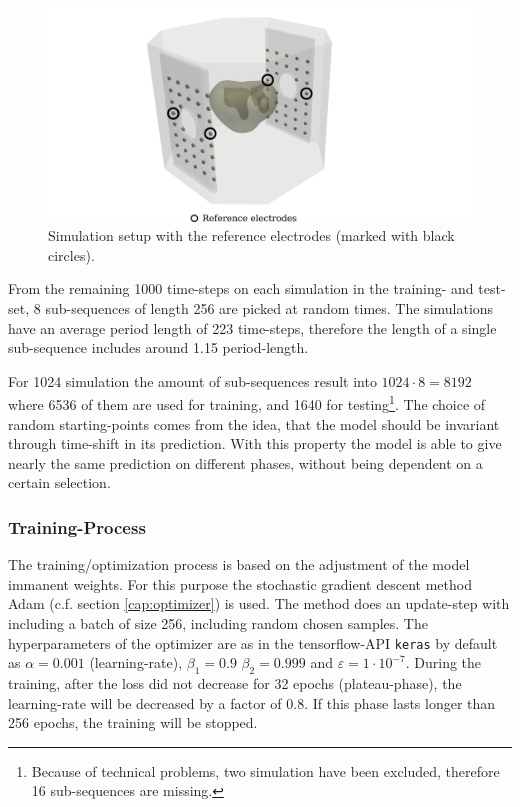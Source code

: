 \begin{figure}[ht]
    \centering
    \hspace*{-1.7cm}
    \includegraphics[width=1.4\textwidth]{figures/heart_overview_inkscape.png}
	\caption{Simulation setup with the reference electrodes (marked with black circles).}
	\label{fig:simulation_concentric_wave_overview}
\end{figure}

From the remaining 1000 time-steps on each simulation in the training- and test-set, 8 sub-sequences of length 256 are picked at random times. The simulations have an average period length of 223 time-steps, therefore the length of a single sub-sequence includes around 1.15 period-length. 

For 1024 simulation the amount of sub-sequences result into $1024\cdot8=8192$ where 6536 of them are used for training, and 1640 for testing\footnote{Because of technical problems, two simulation have been excluded, therefore 16 sub-sequences are missing.}. The choice of random starting-points comes from the idea, that the model should be invariant through time-shift in its prediction. With this property the model is able to give nearly the same prediction on different phases, without being dependent on a certain selection.\\


\subsubsection{Training-Process}
The training/optimization process is based on the adjustment of the model immanent weights. For this purpose the stochastic gradient descent method Adam (c.f. section \ref{cap:optimizer}) is used. The method does an update-step with including a batch of size 256, including random chosen samples. The hyperparameters of the optimizer are as in the tensorflow-API \texttt{keras} by default as $\alpha=0.001$ (learning-rate), $\beta_1=0.9$ $\beta_2=0.999$ and $\varepsilon=1\cdot 10^{-7}$.
During the training, after the loss did not decrease for 32 epochs (plateau-phase), the learning-rate will be decreased by a factor of 0.8. If this phase lasts longer than 256 epochs, the training will be stopped.

